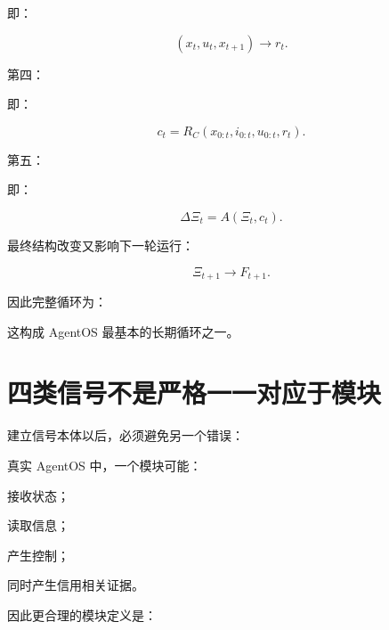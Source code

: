 即：

\[
(x_t,u_t,x_{t+1})
\rightarrow
r_t.
\]

第四：

\begin{statementbox}
\centering
{}
\end{statementbox}

即：

\[
c_t
=
R_C(
x_{0:t},
i_{0:t},
u_{0:t},
r_t
).
\]

第五：

\begin{statementbox}
\centering
{}
\end{statementbox}

即：

\[
\Delta\Xi_t
=
A(
\Xi_t,
c_t
).
\]

最终结构改变又影响下一轮运行：

\[
\boxed{
\Xi_{t+1}
\rightarrow
F_{t+1}.
}
\]

因此完整循环为：

\begin{statementbox}
\centering
{}
\end{statementbox}

这构成 AgentOS 最基本的长期循环之一。

\section{四类信号不是严格一一对应于模块}

建立信号本体以后，必须避免另一个错误：

\begin{statementbox}
\centering
{}
\end{statementbox}

真实 AgentOS 中，一个模块可能：

接收状态；

读取信息；

产生控制；

同时产生信用相关证据。

因此更合理的模块定义是：

